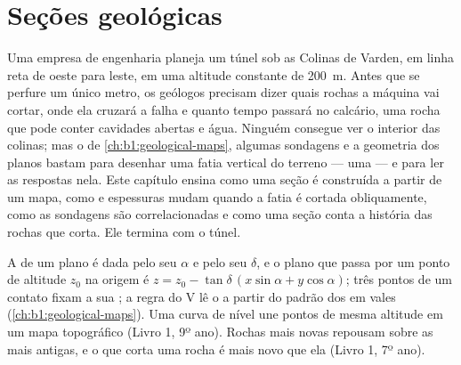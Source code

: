 \chapter{Seções geológicas}\label{ch:b1:cross-sections}

Uma empresa de engenharia planeja um túnel sob as Colinas de Varden, em linha reta de oeste para leste, em uma altitude constante de \qty{200}{m}. Antes que se perfure um único metro, os geólogos precisam dizer quais rochas a máquina vai cortar, onde ela cruzará a falha e quanto tempo passará no calcário, uma rocha que pode conter cavidades abertas e água. Ninguém consegue ver o interior das colinas; mas o  de \cref{ch:b1:geological-maps}, algumas sondagens e a geometria dos planos bastam para desenhar uma fatia vertical do terreno --- uma  --- e para ler as respostas nela. Este capítulo ensina como uma seção é construída a partir de um mapa, como  e espessuras mudam quando a fatia é cortada obliquamente, como as sondagens são correlacionadas e como uma seção conta a história das rochas que corta. Ele termina com o túnel.

\begin{recall}
A  de um plano é dada pelo seu  $\alpha$ e pelo seu  $\delta$, e o plano que passa por um ponto de altitude $z_0$ na origem é $z = z_0 - \tan\delta\,(x\sin\alpha + y\cos\alpha)$; três pontos de um contato fixam a sua ; a regra do V lê o  a partir do padrão dos  em vales (\cref{ch:b1:geological-maps}). Uma curva de nível une pontos de mesma altitude em um mapa topográfico (Livro 1, 9º ano). Rochas mais novas repousam sobre as mais antigas, e o que corta uma rocha é mais novo que ela (Livro 1, 7º ano).
\end{recall}

